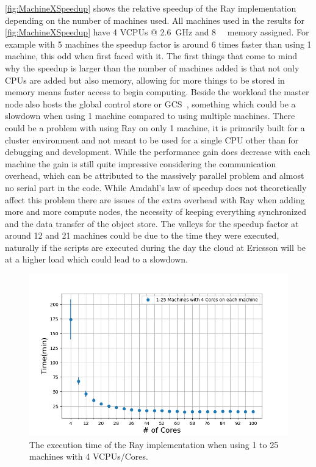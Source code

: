 \documentclass[12pt, a4paper]{article}
\begin{document}
\cref{fig:MachineXSpeedup} shows the relative speedup of the Ray implementation depending on the number of machines used.
All machines used in the results for \cref{fig:MachineXSpeedup} have 4 VCPUs @ \SI{2.6}{\giga\hertz} and \SI{8}{\giga\byte} memory assigned.
For example with 5 machines the speedup factor is around 6 times faster than using 1 machine, this odd when first faced with it.
The first things that come to mind why the speedup is larger than the number of machines added is that not only CPUs are added but also memory, allowing for more things to be stored in memory means faster access to begin computing.
Beside the workload the master node also hosts the global control store or GCS~\cite{ray:rayCluster, ray:GCS, ray:Architecture}, something which could be a slowdown when using 1 machine compared to using multiple machines.
There could be a problem with using Ray on only 1 machine, it is primarily built for a cluster environment and not meant to be used for a single CPU other than for debugging and development.
While the performance gain does decrease with each machine the gain is still quite impressive considering the communication overhead, which can be attributed to the massively parallel problem and almost no serial part in the code.
While Amdahl's law of speedup does not theoretically affect this problem there are issues of the extra overhead with Ray when adding more and more compute nodes, the necessity of keeping everything synchronized and the data transfer of the object store.
The valleys for the speedup factor at around 12 and 21 machines could be due to the time they were executed, naturally if the scripts are executed during the day the cloud at Ericsson will be at a higher load which could lead to a slowdown.

\begin{figure}[H]
    \centering
    \includegraphics[width=1.0\textwidth, ]{pictures/CoresXTimeMinutesWhite.png}
    \caption{The execution time of the Ray implementation when using 1 to 25 machines with 4 VCPUs/Cores.}
    \label{fig:CoresXTime}
\end{figure}
\end{document}
